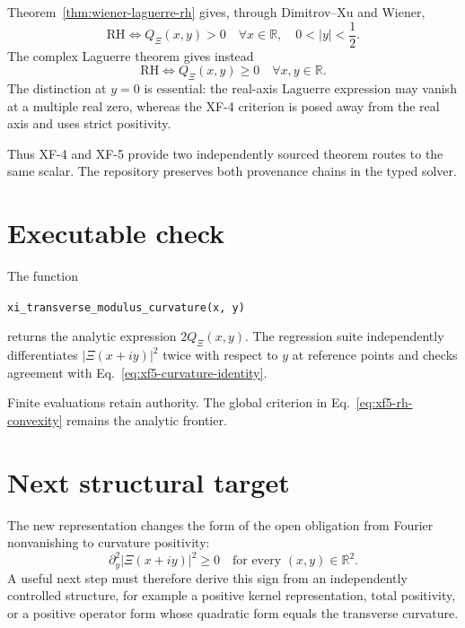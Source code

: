 Theorem~\ref{thm:wiener-laguerre-rh} gives, through Dimitrov--Xu and Wiener,
\[
\mathrm{RH}
\iff
Q_\Xi(x,y)>0
\quad
\forall x\in\mathbb R,
\quad0<|y|<\frac12.
\]
The complex Laguerre theorem gives instead
\[
\mathrm{RH}
\iff
Q_\Xi(x,y)\ge0
\quad
\forall x,y\in\mathbb R.
\]
The distinction at $y=0$ is essential: the real-axis Laguerre expression may vanish at a multiple real zero, whereas the XF-4 criterion is posed away from the real axis and uses strict positivity.

Thus XF-4 and XF-5 provide two independently sourced theorem routes to the same scalar.  The repository preserves both provenance chains in the typed solver.

\section{Executable check}

The function
\begin{center}
\texttt{xi\_transverse\_modulus\_curvature(x, y)}
\end{center}
returns the analytic expression $2Q_\Xi(x,y)$.  The regression suite independently differentiates $|\Xi(x+iy)|^2$ twice with respect to $y$ at reference points and checks agreement with Eq.~\eqref{eq:xf5-curvature-identity}.

Finite evaluations retain  authority.  The global criterion in Eq.~\eqref{eq:xf5-rh-convexity} remains the analytic frontier.

\section{Next structural target}

The new representation changes the form of the open obligation from Fourier nonvanishing to curvature positivity:
\begin{equation}\label{eq:xf5-frontier}
\boxed{
\partial_y^2|\Xi(x+iy)|^2\ge0
\quad
\text{for every }(x,y)\in\mathbb R^2.
}
\end{equation}
A useful next step must therefore derive this sign from an independently controlled structure, for example a positive kernel representation, total positivity, or a positive operator form whose quadratic form equals the transverse curvature.
